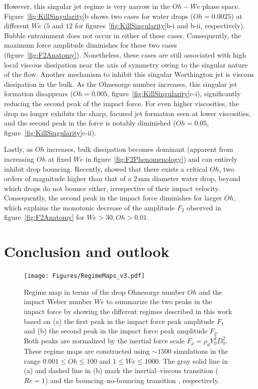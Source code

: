 \documentclass{jfm}
\begin{document}
However, this singular jet regime is very narrow in the $Oh-We$ phase space. Figure~\ref{fig:KillSingularity}b shows two cases for water drops ($Oh = 0.0025$) at different $We$ ($5$ and $12$ for figures~\ref{fig:KillSingularity}b-i and b-ii, respectively). Bubble entrainment does not occur in either of these cases. Consequently, the maximum force amplitude diminishes for these two cases (figure~\ref{fig:F2Anatomy}). Nonetheless, these cases are still associated with high local viscous dissipation near the axis of symmetry owing to the singular nature of the flow. Another mechanism to inhibit this singular Worthington jet is viscous dissipation in the bulk. As the Ohnesorge number increases, this singular jet formation disappears ($Oh = 0.005$, figure~\ref{fig:KillSingularity}c-i), significantly reducing the second peak of the impact force. For even higher viscosities, the drop no longer exhibits the sharp, focused jet formation seen at lower viscosities, and the second peak in the force is notably diminished ($Oh = 0.05$, figure~\ref{fig:KillSingularity}c-ii).

Lastly,  as $Oh$ increases, bulk dissipation becomes dominant (apparent from increasing $Oh$ at fixed $We$ in figure~\ref{fig:F2Phenomenology}) and can entirely inhibit drop bouncing. Recently, \citet{Jha2020, sanjay_chantelot_lohse_2023} showed that there exists a critical $Oh$, two orders of magnitude higher than that of a $2\,\si{\milli\meter}$ diameter water drop, beyond which drops do not bounce either, irrespective of their impact velocity. Consequently, the second peak in the impact force diminishes for larger $Oh$, which explains the monotonic decrease of the amplitude $F_2$ observed in figure~\ref{fig:F2Anatomy} for $We > 30, Oh > 0.01$.

\section{Conclusion and outlook}\label{sec:Conclusion}

\begin{figure}
	\centering
	\texttt{[image: Figures/RegimeMaps\_v3.pdf]}
	\caption{Regime map in terms of the drop Ohnesorge number $Oh$ and the impact Weber number $We$ to summarize the two peaks in the impact force by showing the different regimes described in this work based on (a) the first peak in the impact force peak amplitude $F_1$ and (b) the second peak in the impact force peak amplitude $F_2$. Both peaks are normalized by the inertial force scale $F_\rho = \rho_dV_0^2D_0^2$. These regime maps are constructed using $\sim 1500$ simulations in the range $0.001 \leq Oh \leq 100$ and $1 \leq We \leq 1000$. The gray solid line in (a) and dashed line in (b) mark the inertial--viscous transition ($Re = 1$) and the bouncing--no-bouncing transition \citep[$Oh_c = 0.53$ for $Bo = 1$, see][]{sanjay_chantelot_lohse_2023}, respectively.}
	\label{fig:RegimeMaps}
\end{figure}
\end{document}
